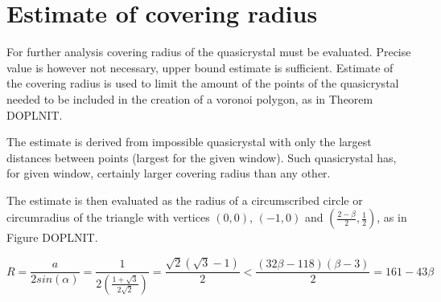 \documentclass[text.tex]{subfiles}
\begin{document}
\section{Estimate of covering radius}

For further analysis covering radius of the quasicrystal must be evaluated. 
Precise value is however not necessary, upper bound estimate is sufficient. 
Estimate of the covering radius is used to limit the amount of the points of the quasicrystal needed to be included in the creation of a voronoi polygon, as in Theorem DOPLNIT. 

The estimate is derived from impossible quasicrystal with only the largest distances between points (largest for the given window). Such quasicrystal has, for given window, certainly larger covering radius than any other. 

The estimate is then evaluated as the radius of a circumscribed circle or circumradius of the triangle with vertices $(0,0)$, $(-1,0)$ and $\left(\frac{2-\beta}{2},\frac{1}{2}\right)$, as in Figure DOPLNIT. 

$$R = \frac{a}{2sin(\alpha)} = \frac{1}{2\left(\frac{1+\sqrt{3}}{2\sqrt{2}}\right)} = \frac{\sqrt{2}(\sqrt{3}-1)}{2} < \frac{(32\beta-118)(\beta-3)}{2} = 161-43\beta$$
\end{document}

